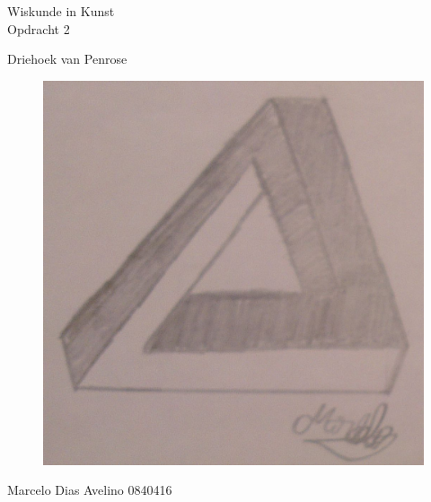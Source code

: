 \documentclass{article}
\begin{document}
\begin{center}
	\huge{Wiskunde in Kunst}\\
	\LARGE{Opdracht 2} \\
	
	\vspace{2cm}
	
	\Large{Driehoek van Penrose}
	
	\begin{figure}[htp]
		\centering
		\includegraphics[width=\textwidth]{triangle.jpg}
	\end{figure}
	
	\vfill
	\Large{Marcelo Dias Avelino} \hfill \large{0840416}
\end{center}
\end{document}
